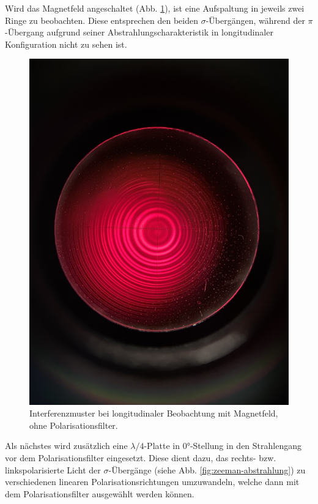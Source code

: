 \documentclass{article}
\begin{document}
\begin{multicols}{2}
Wird das Magnetfeld angeschaltet (Abb. \ref{fig:zeeman-longitudinal-mit-ohne}), ist eine Aufspaltung in jeweils zwei Ringe zu beobachten.
Diese entsprechen den beiden $\sigma$-Übergängen, während der $\pi$-Übergang aufgrund seiner Abstrahlungscharakteristik
in longitudinaler Konfiguration nicht zu sehen ist.
\begin{figure}[H]
  \centering
  \includegraphics[width=.8\linewidth]{zeeman-longitudinal-mit-ohne}
  \caption{Interferenzmuster bei longitudinaler Beobachtung mit Magnetfeld, ohne Polarisationsfilter.}
  \label{fig:zeeman-longitudinal-mit-ohne}
\end{figure}

Als nächstes wird zusätzlich eine $\lambda / 4$-Platte in \ang{0}-Stellung in den Strahlengang vor dem
Polarisationsfilter eingesetzt. Diese dient dazu, das rechts- bzw. linkspolarisierte Licht der $\sigma$-Übergänge
(siehe Abb. \ref{fig:zeeman-abstrahlung}) zu verschiedenen linearen Polarisationsrichtungen umzuwandeln,
welche dann mit dem Polarisationsfilter ausgewählt werden können.


\end{multicols}
\end{document}
